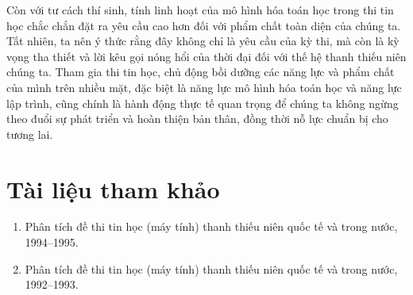 \documentclass[11pt]{article}
\begin{document}
Còn với tư cách thí sinh, tính linh hoạt của mô hình hóa toán học trong thi
tin học chắc chắn đặt ra yêu cầu cao hơn đối với phẩm chất toàn diện của
chúng ta. Tất nhiên, ta nên ý thức rằng đây không chỉ là yêu cầu của kỳ thi,
mà còn là kỳ vọng tha thiết và lời kêu gọi nóng hổi của thời đại đối với thế
hệ thanh thiếu niên chúng ta. Tham gia thi tin học, chủ động bồi dưỡng các
năng lực và phẩm chất của mình trên nhiều mặt, đặc biệt là năng lực mô hình
hóa toán học và năng lực lập trình, cũng chính là hành động thực tế quan
trọng để chúng ta không ngừng theo đuổi sự phát triển và hoàn thiện bản thân,
đồng thời nỗ lực chuẩn bị cho tương lai.

\section*{Tài liệu tham khảo}

\begin{enumerate}
  \item Phân tích đề thi tin học (máy tính) thanh thiếu niên quốc tế và trong
  nước, 1994--1995.
  \item Phân tích đề thi tin học (máy tính) thanh thiếu niên quốc tế và trong
  nước, 1992--1993.
\end{enumerate}
\end{document}
